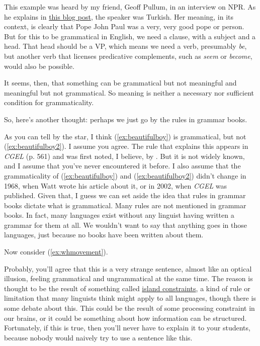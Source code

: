 This example was heard by my friend, Geoff Pullum, in an interview on NPR. As he explains in \href{http://itre.cis.upenn.edu/~myl/languagelog/archives/003830.html}{this blog post}, the speaker was Turkish. Her meaning, in its context, is clearly that Pope John Paul was a very, very good pope or person. But for this to be grammatical in English, we need a clause, with a subject and a head. That head should be a VP, which means we need a verb, presumably \textit{be}, but another verb that licenses predicative complements, such as \textit{seem} or \textit{become}, would also be possible.

It seems, then, that something can be grammatical but not meaningful and meaningful but not grammatical. So meaning is neither a necessary nor sufficient condition for grammaticality.

So, here's another thought: perhaps we just go by the rules in grammar books.

\ea
    \label{ex:beautifulboy} 
    \label{ex:beautifulboy2}
    \z
\z

As you can tell by the star, I think (\ref{ex:beautifulboy}) is grammatical, but not (\ref{ex:beautifulboy2}). I assume you agree. The rule that explains this appears in \textit{CGEL} (p. 561) and was first noted, I believe, by \textcite{Watt1968}. But it is not widely known, and I assume that you've never encountered it before. I also assume that the grammaticality of (\ref{ex:beautifulboy}) and (\ref{ex:beautifulboy2}) didn't change in 1968, when Watt wrote his article about it, or in 2002, when \textit{CGEL} was published. Given that, I guess we can set aside the idea that rules in grammar books dictate what is grammatical. Many rules are not mentioned in grammar books. In fact, many languages exist without any linguist having written a grammar for them at all. We wouldn't want to say that anything goes in those languages, just because no books have been written about them.

Now consider (\ref{ex:whmovement}).

\label{ex:whmovement}
\z

Probably, you'll agree that this is a very strange sentence, almost like an optical illusion, feeling grammatical and ungrammatical at the same time. The reason is thought to be the result of something called \href{https://en.wikipedia.org/wiki/Wh-movement#Extraction_islands}{island constraints}, a kind of rule or limitation that many linguists think might apply to all languages, though there is some debate about this. This could be the result of some processing constraint in our brains, or it could be something about how information can be structured. Fortunately, if this is true, then you'll never have to explain it to your students, because nobody would naively try to use a sentence like this.

